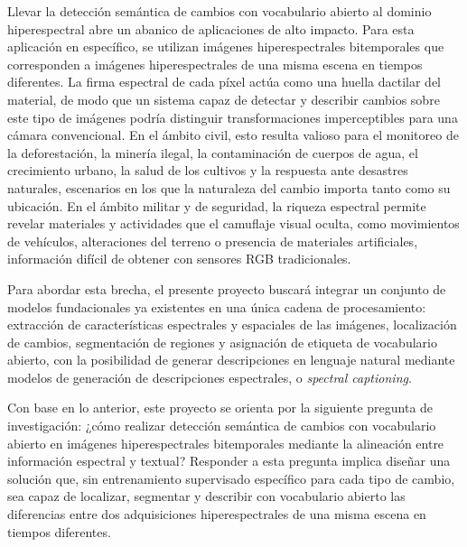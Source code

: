 \documentclass[12pt,onecolumn]{IEEEtran}
\begin{document}
Llevar la detección semántica de cambios con vocabulario abierto al dominio hiperespectral abre un abanico de aplicaciones de alto impacto. Para esta aplicación en específico, se utilizan imágenes hiperespectrales bitemporales que corresponden a imágenes hiperespectrales de una misma escena en tiempos diferentes. La firma espectral de cada píxel actúa como una huella dactilar del material, de modo que un sistema capaz de detectar y describir cambios sobre este tipo de imágenes podría distinguir transformaciones imperceptibles para una cámara convencional. En el ámbito civil, esto resulta valioso para el monitoreo de la deforestación, la minería ilegal, la contaminación de cuerpos de agua, el crecimiento urbano, la salud de los cultivos y la respuesta ante desastres naturales, escenarios en los que la naturaleza del cambio importa tanto como su ubicación. En el ámbito militar y de seguridad, la riqueza espectral permite revelar materiales y actividades que el camuflaje visual oculta, como movimientos de vehículos, alteraciones del terreno o presencia de materiales artificiales, información difícil de obtener con sensores RGB tradicionales.

Para abordar esta brecha, el presente proyecto buscará integrar un conjunto de modelos fundacionales ya existentes en una única cadena de procesamiento: extracción de características espectrales y espaciales de las imágenes, localización de cambios, segmentación de regiones y asignación de etiqueta de vocabulario abierto, con la posibilidad de generar descripciones en lenguaje natural mediante modelos de generación de descripciones espectrales, o \textit{spectral captioning}.

Con base en lo anterior, este proyecto se orienta por la siguiente pregunta de investigación: ¿cómo realizar detección semántica de cambios con vocabulario abierto en imágenes hiperespectrales bitemporales mediante la alineación entre información espectral y textual? Responder a esta pregunta implica diseñar una solución que, sin entrenamiento supervisado específico para cada tipo de cambio, sea capaz de localizar, segmentar y describir con vocabulario abierto las diferencias entre dos adquisiciones hiperespectrales de una misma escena en tiempos diferentes.
\end{document}
